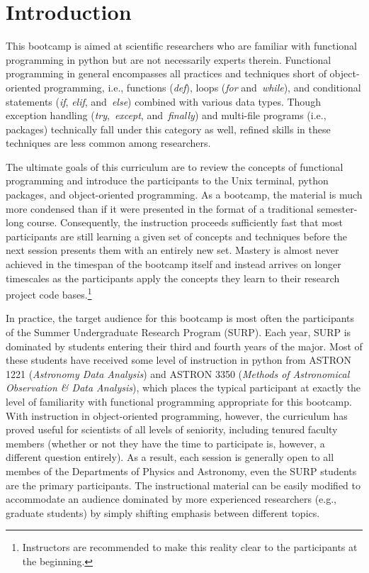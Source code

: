
\section{Introduction}
\label{sec:intro}
\noindent
This bootcamp is aimed at scientific researchers who are familiar with
functional programming in python but are not necessarily experts therein.
Functional programming in general encompasses all practices and techniques
short of object-oriented programming, i.e., functions (\textit{def}), loops
(\textit{for} and~\textit{while}), and conditional statements (\textit{if},
\textit{elif}, and~\textit{else}) combined with various data types.
Though exception handling (\textit{try},~\textit{except}, and~\textit{finally})
and multi-file programs (i.e., packages) technically fall under this category
as well, refined skills in these techniques are less common among researchers.
\par
The ultimate goals of this curriculum are to review the concepts of functional
programming and introduce the participants to the Unix terminal, python
packages, and object-oriented programming.
As a bootcamp, the material is much more condensed than if it were presented in
the format of a traditional semester-long course.
Consequently, the instruction proceeds sufficiently fast that most participants
are still learning a given set of concepts and techniques before the next
session presents them with an entirely new set.
Mastery is almost never achieved in the timespan of the bootcamp itself and
instead arrives on longer timescales as the participants apply the concepts
they learn to their research project code bases.\footnote{
	Instructors are recommended to make this reality clear to the participants
	at the beginning.
}
\par
In practice, the target audience for this bootcamp is most often the
participants of the Summer Undergraduate Research Program (SURP).
Each year, SURP is dominated by students entering their third and fourth years
of the major.
Most of these students have received some level of instruction in python from
ASTRON 1221 (\textit{Astronomy Data Analysis}) and ASTRON 3350 (\textit{Methods
of Astronomical Observation \& Data Analysis}), which places the typical
participant at exactly the level of familiarity with functional programming
appropriate for this bootcamp.
With instruction in object-oriented programming, however, the curriculum has
proved useful for scientists of all levels of seniority, including tenured
faculty members (whether or not they have the time to participate is, however,
a different question entirely).
As a result, each session is generally open to all membes of the Departments of
Physics and Astronomy, even the SURP students are the primary participants.
The instructional material can be easily modified to accommodate an audience
dominated by more experienced researchers (e.g., graduate students) by simply
shifting emphasis between different topics.

